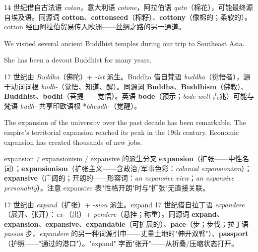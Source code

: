 \documentclass[../main.tex]{subfiles}
\begin{document}
\begin{origin}
14 世纪借自古法语 \textit{coton}，意大利语 \textit{cotone}，阿拉伯语 \textit{qutn}（棉花），可能最终源自埃及语。同源词 \textbf{cotton}、\textbf{cottonseed}（棉籽）、\textbf{cottony}（像棉的；柔软的）。cotton 经由阿拉伯贸易传入欧洲——丝绸之路的另一通道。
\end{origin}


{We visited several ancient Buddhist temples during our trip to Southeast Asia.}

{She has been a devout Buddhist for many years.}

\begin{origin}
17 世纪由 \textit{Buddha}（佛陀）+ \textit{-ist} 派生。Buddha 借自梵语 \textit{buddha}（觉悟者），源于动词词根 \textit{budh-}（觉悟、知道、醒）。同源词 \textbf{Buddha}、\textbf{Buddhism}（佛教）、\textbf{Buddhist}、\textbf{bodhi}（菩提——觉悟）。英语 \textbf{bode}（预示；\textit{bode well} 吉兆）可能与梵语 \textit{budh-} 共享印欧语根 *\textit{bheudh-}（觉醒）。
\end{origin}


{The expansion of the university over the past decade has been remarkable.}
{The empire's territorial expansion reached its peak in the 19th century.}
{Economic expansion has created thousands of new jobs.}

\begin{gram}{expansion / expansionism / expansive 的派生分叉}
\textbf{expansion}（扩张——中性名词）；\textbf{expansionism}（扩张主义——含政治/军事色彩：\textit{colonial expansionism}）；\textbf{expansive}（广阔的；开朗的——形容词：\textit{an expansive view}；\textit{an expansive personality}）。注意 expansive 表"性格开朗"时与"扩张"无直接关联。
\end{gram}

\begin{origin}
17 世纪由 \textit{expand}（扩张）+ \textit{-sion} 派生。expand 17 世纪借自拉丁语 \textit{expandere}（展开、张开）：\textit{ex-}（出）+ \textit{pendere}（悬挂；称重）。同源词 \textbf{expand}、\textbf{expansion}、\textbf{expansive}、\textbf{expandable}（可扩展的）、\textbf{pace}（步；步伐；拉丁语 \textit{passus} 步，\textit{expandere} 的另一种词源引申——丈量土地时"伸开双臂"）、\textbf{passport}（护照——"通过的港口"）。"expand" 字面"张开"——从折叠/压缩状态打开。
\end{origin}
\end{document}
